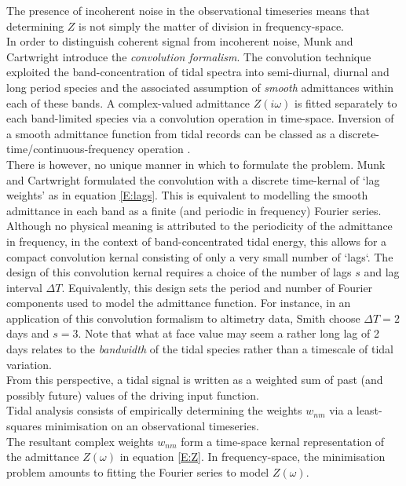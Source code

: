 The presence of incoherent noise in the observational timeseries means that determining $Z$ is not simply the matter of division in frequency-space.\\



In order to distinguish coherent signal from incoherent noise, Munk and Cartwright introduce the \emph{convolution formalism}. The convolution technique exploited the band-concentration of tidal spectra into semi-diurnal, diurnal and long period species and the associated assumption of \emph{smooth} admittances within each of these bands.  A complex-valued admittance $Z(i\omega)$ is fitted separately to each band-limited species via a convolution operation in time-space. 
Inversion of a smooth admittance function from tidal records can be classed as a discrete-time/continuous-frequency operation \citep{Percival:1998tw}.\\

There is however, no unique manner in which to formulate the problem.  Munk and Cartwright formulated the convolution with a discrete time-kernal of `lag weights' as in equation \ref{E:lags}.   This is equivalent to modelling the smooth admittance in each band as a finite (and periodic in frequency) Fourier series.   Although no physical meaning is attributed to the periodicity of the admittance in frequency, in the context of band-concentrated tidal energy, this allows for a compact convolution kernal consisting of only a very small number of `lags`.   The design of this convolution kernal requires a choice of the number of lags $s$ and lag interval $\Delta T$.  Equivalently, this design sets the period and number of Fourier components used to model the admittance function.  For instance, in an application of this convolution formalism to altimetry data, Smith \citep{Smith:1997ut} choose $\Delta T=2$ days and $s=3$.   Note that what at face value may seem a rather long lag of 2 days relates to the \emph{bandwidth} of the tidal species rather than a timescale of tidal variation.\\
From this perspective, a tidal signal is written as a weighted sum of past (and possibly future) values of the driving input function.  \\ 
Tidal analysis consists of empirically determining the weights $w_{nm}$ via a least-squares minimisation on an observational timeseries.\\
The resultant complex weights $w_{nm}$ form a time-space kernal representation of the admittance $Z(\omega)$ in equation \ref{E:Z}.   In frequency-space, the minimisation problem amounts to fitting the Fourier series to model $Z(\omega)$.\\

